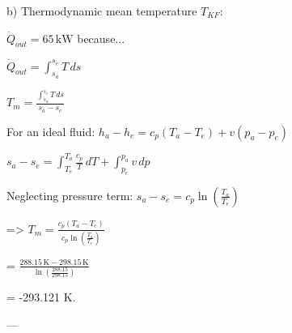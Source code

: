 b) Thermodynamic mean temperature \( T_{KF} \):  

\( \dot{Q}_{out} = 65 \, \text{kW} \) because...  

\( \dot{Q}_{out} = \int_{s_a}^{s_e} T \, ds \)  

\( T_{m} = \frac{\int_{s_a}^{s_e} T \, ds}{s_a - s_e} \)  

For an ideal fluid:  
\( h_a - h_e = c_p (T_a - T_e) + v (p_a - p_e) \)  

\( s_a - s_e = \int_{T_e}^{T_a} \frac{c_p}{T} \, dT + \int_{p_e}^{p_a} v \, dp \)  

Neglecting pressure term:  
\( s_a - s_e = c_p \ln \left( \frac{T_a}{T_e} \right) \)  

=> \( T_m = \frac{c_p (T_a - T_e)}{c_p \ln \left( \frac{T_a}{T_e} \right)} \)  

= \( \frac{288.15 \, \text{K} - 298.15 \, \text{K}}{\ln \left( \frac{288.15}{298.15} \right)} \)  

= -293.121 K.  

---